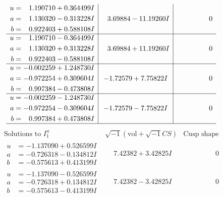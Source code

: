 \documentclass[1p]{elsarticle_modified}
\theoremstyle{definition}
\newcommand{\I}{\sqrt{-1}}
\begin{document}
$$\begin{array}{c|c|c}
\begin{aligned}
u &= \phantom{-}1.190710 + 0.364499 I \\
a &= \phantom{-}1.130320 - 0.313228 I \\
b &= \phantom{-}0.922403 + 0.588108 I\end{aligned}
 & \phantom{-}3.69884 - 11.19260 I & \phantom{-0.000000 } 0 \\ \hline\begin{aligned}
u &= \phantom{-}1.190710 - 0.364499 I \\
a &= \phantom{-}1.130320 + 0.313228 I \\
b &= \phantom{-}0.922403 - 0.588108 I\end{aligned}
 & \phantom{-}3.69884 + 11.19260 I & \phantom{-0.000000 } 0 \\ \hline\begin{aligned}
u &= -0.002259 + 1.248730 I \\
a &= -0.972254 + 0.309604 I \\
b &= \phantom{-}0.997384 - 0.473808 I\end{aligned}
 & -1.72579 + 7.75822 I & \phantom{-0.000000 } 0 \\ \hline\begin{aligned}
u &= -0.002259 - 1.248730 I \\
a &= -0.972254 - 0.309604 I \\
b &= \phantom{-}0.997384 + 0.473808 I\end{aligned}
 & -1.72579 - 7.75822 I & \phantom{-0.000000 } 0\\
 \hline 
 \end{array}$$\newpage$$\begin{array}{c|c|c}  
\text{Solutions to }I^u_{1}& \I (\text{vol} + \sqrt{-1}CS) & \text{Cusp shape}\\
 \hline 
\begin{aligned}
u &= -1.137090 + 0.526599 I \\
a &= -0.726318 - 0.134812 I \\
b &= -0.575613 + 0.413199 I\end{aligned}
 & \phantom{-}7.42382 + 3.42825 I & \phantom{-0.000000 } 0 \\ \hline\begin{aligned}
u &= -1.137090 - 0.526599 I \\
a &= -0.726318 + 0.134812 I \\
b &= -0.575613 - 0.413199 I\end{aligned}
 & \phantom{-}7.42382 - 3.42825 I & \phantom{-0.000000 } 0 \\ \hline\begin{aligned}

\end{aligned}
\end{array}$$
\end{document}
